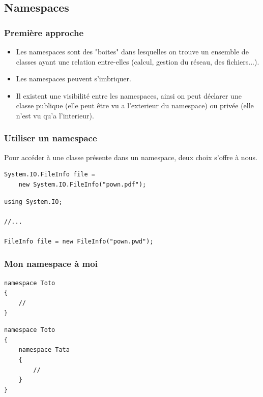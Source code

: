 \documentclass{beamer}
\begin{document}
\subsection{Namespaces}

\begin{frame}
\frametitle{Première approche}
\begin{itemize}
\item Les namespaces sont des "boites" dans lesquelles on trouve un ensemble de classes ayant une relation entre-elles (calcul, gestion du réseau, des fichiers...).
\item Les namespaces peuvent s'imbriquer.
\item Il existent une visibilité entre les namespaces, ainsi on peut déclarer une classe publique (elle peut être vu a l'exterieur du namespace) ou privée (elle n'est vu qu'a l'interieur).

\end{itemize}
\end{frame}

\begin{frame}[fragile]
\frametitle{Utiliser un namespace}
Pour accéder à une classe présente dans un namespace, deux choix s'offre à nous.
\begin{lstlisting}
System.IO.FileInfo file = 
    new System.IO.FileInfo("pown.pdf");
\end{lstlisting}
\pause
\begin{lstlisting}
using System.IO;

//...

FileInfo file = new FileInfo("pown.pwd");
\end{lstlisting}
\end{frame}

\begin{frame}[fragile]
\frametitle{Mon namespace à moi}
\begin{lstlisting}
namespace Toto
{
    //
}
\end{lstlisting}
\pause
\begin{lstlisting}
namespace Toto
{
    namespace Tata
    {
        //
    }
}
\end{lstlisting}
\end{frame}
\end{document}
